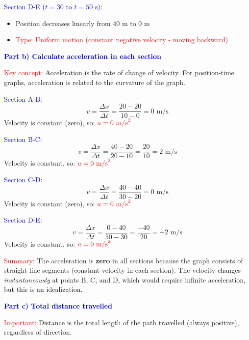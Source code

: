 \begin{exercise}
\begin{solu}
        \textcolor{blue}{Section D-E ($t = 30$ to $t = 50$ s):}
        \begin{itemize}
            \item Position decreases linearly from 40 m to 0 m
            \item \textcolor{red}{Type: Uniform motion (constant negative velocity - moving backward)}
        \end{itemize}

        \vspace{0.5cm}

        \textbf{\textcolor{blue}{Part b) Calculate acceleration in each section}}

        \textcolor{red}{Key concept:} Acceleration is the rate of change of velocity. For position-time graphs, acceleration is related to the curvature of the graph.

        \textcolor{blue}{Section A-B:}
        \[
            v = \frac{\Delta x}{\Delta t} = \frac{20 - 20}{10 - 0} = 0 \text{ m/s}
        \]
        Velocity is constant (zero), so: $\textcolor{red}{a = 0 \text{ m/s}^2}$

        \textcolor{blue}{Section B-C:}
        \[
            v = \frac{\Delta x}{\Delta t} = \frac{40 - 20}{20 - 10} = \frac{20}{10} = 2 \text{ m/s}
        \]
        Velocity is constant, so: $\textcolor{red}{a = 0 \text{ m/s}^2}$

        \textcolor{blue}{Section C-D:}
        \[
            v = \frac{\Delta x}{\Delta t} = \frac{40 - 40}{30 - 20} = 0 \text{ m/s}
        \]
        Velocity is constant (zero), so: $\textcolor{red}{a = 0 \text{ m/s}^2}$

        \textcolor{blue}{Section D-E:}
        \[
            v = \frac{\Delta x}{\Delta t} = \frac{0 - 40}{50 - 30} = \frac{-40}{20} = -2 \text{ m/s}
        \]
        Velocity is constant, so: $\textcolor{red}{a = 0 \text{ m/s}^2}$

        \textcolor{red}{Summary:} The acceleration is \textbf{zero} in all sections because the graph consists of straight line segments (constant velocity in each section). The velocity changes \textit{instantaneously} at points B, C, and D, which would require infinite acceleration, but this is an idealization.

        \vspace{0.5cm}

        \textbf{\textcolor{blue}{Part c) Total distance travelled}}

        \textcolor{red}{Important:} Distance is the total length of the path travelled (always positive), regardless of direction.


\end{solu}
\end{exercise}
